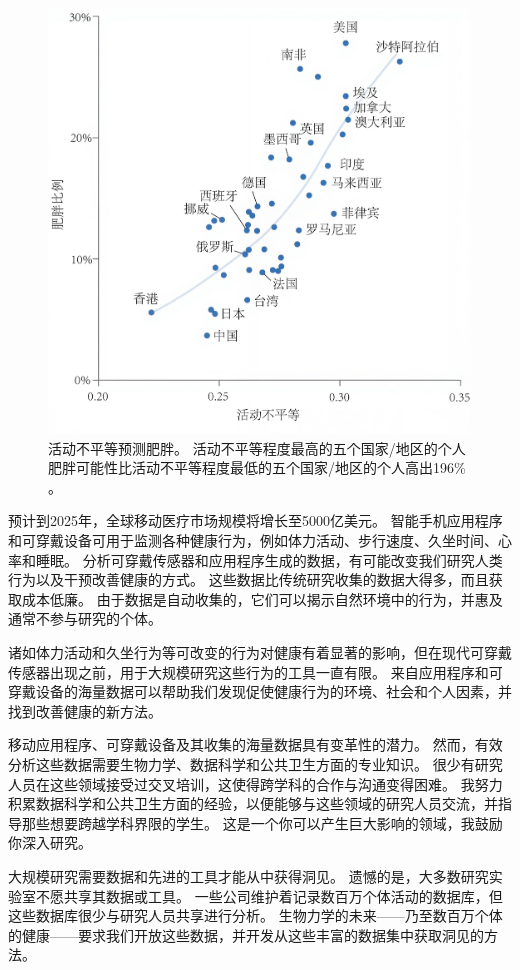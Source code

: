\begin{figure}[!htb]
	\centering
	\includegraphics[width=0.75\linewidth]{chap13/13_2}
	\caption{活动不平等预测肥胖。
		活动不平等程度最高的五个国家/地区的个人肥胖可能性比活动不平等程度最低的五个国家/地区的个人高出196\% \cite{althoff2017large}。 \label{fig:13_2}}
\end{figure}


预计到2025年，全球移动医疗市场规模将增长至5000亿美元\cite{dwivedi2025digital}。
智能手机应用程序和可穿戴设备可用于监测各种健康行为，例如体力活动、步行速度、久坐时间、心率和睡眠。
分析可穿戴传感器和应用程序生成的数据，有可能改变我们研究人类行为以及干预改善健康的方式。
这些数据比传统研究收集的数据大得多，而且获取成本低廉。
由于数据是自动收集的，它们可以揭示自然环境中的行为，并惠及通常不参与研究的个体。


诸如体力活动\cite{world2010global}和久坐行为\cite{biswas2015sedentary}等可改变的行为对健康有着显著的影响，但在现代可穿戴传感器出现之前，用于大规模研究这些行为的工具一直有限。
来自应用程序和可穿戴设备的海量数据可以帮助我们发现促使健康行为的环境、社会和个人因素，并找到改善健康的新方法。


移动应用程序、可穿戴设备及其收集的海量数据具有变革性的潜力。
然而，有效分析这些数据需要生物力学、数据科学和公共卫生方面的专业知识。
很少有研究人员在这些领域接受过交叉培训，这使得跨学科的合作与沟通变得困难。
我努力积累数据科学和公共卫生方面的经验，以便能够与这些领域的研究人员交流，并指导那些想要跨越学科界限的学生。
这是一个你可以产生巨大影响的领域，我鼓励你深入研究。


大规模研究需要数据和先进的工具才能从中获得洞见。
遗憾的是，大多数研究实验室不愿共享其数据或工具。
一些公司维护着记录数百万个体活动的数据库，但这些数据库很少与研究人员共享进行分析。
生物力学的未来——乃至数百万个体的健康——要求我们开放这些数据，并开发从这些丰富的数据集中获取洞见的方法。


